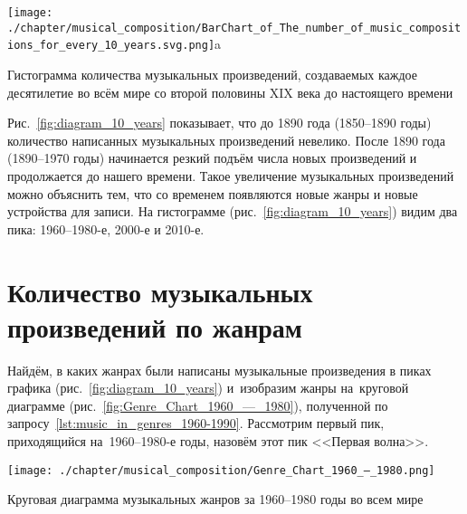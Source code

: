 \newpage
\begin{marginfigure}[-5\baselineskip]
    \texttt{[image: ./chapter/musical\_composition/BarChart\_of\_The\_number\_of\_music\_compositions\_for\_every\_10\_years.svg.png]}a
    \vspace{-7pt}
	\caption{Гистограмма количества музыкальных произведений, 
             создаваемых каждое десятилетие во всём мире со второй половины XIX века до настоящего времени}%
	\label{fig:diagram_10_years}%
\end{marginfigure}
%
Рис.~\ref{fig:diagram_10_years} показывает, что до 1890 года (1850--1890 годы) 
количество написанных музыкальных произведений невелико. 
После 1890 года (1890--1970 годы) начинается резкий подъём числа новых произведений 
и продолжается до нашего времени. 
Такое увеличение музыкальных произведений можно объяснить тем, 
что со временем появляются новые жанры и новые устройства для записи. 
На гистограмме (рис.~\ref{fig:diagram_10_years}) видим два пика: 1960--1980-е, 2000-е и 2010-е.







\newpage
\section{Количество музыкальных произведений по жанрам}

Найдём, в каких жанрах были написаны музыкальные произведения 
в пиках графика (рис.~\ref{fig:diagram_10_years}) 
и~изобразим жанры на~круговой диаграмме (рис.~\ref{fig:Genre_Chart_1960_—_1980}), 
полученной по запросу~\ref{lst:music_in_genres_1960-1990}. 
Рассмотрим первый пик, приходящийся на~1960--1980-е годы, назовём этот пик <<Первая волна>>.

\begin{marginfigure}[0\baselineskip]
	\texttt{[image: ./chapter/musical\_composition/Genre\_Chart\_1960\_—\_1980.png]}
	\caption{Круговая диаграмма музыкальных жанров за 1960--1980 годы во всем мире}%
	\label{fig:Genre_Chart_1960_—_1980}%
\end{marginfigure}

